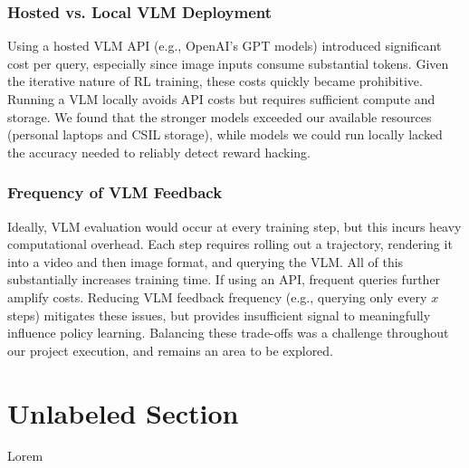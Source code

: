 \documentclass{article}
\begin{document}
\subsubsection{Hosted vs. Local VLM Deployment}
Using a hosted VLM API (e.g., OpenAI's GPT models) introduced significant cost per query, especially since image inputs consume substantial tokens. Given the iterative nature of RL training, these costs quickly became prohibitive. Running a VLM locally avoids API costs but requires sufficient compute and storage. We found that the stronger models exceeded our available resources (personal laptops and CSIL storage), while models we could run locally lacked the accuracy needed to reliably detect reward hacking.

\subsubsection{Frequency of VLM Feedback}
Ideally, VLM evaluation would occur at every training step, but this incurs heavy computational overhead. Each step requires rolling out a trajectory, rendering it into a video and then image format, and querying the VLM. All of this substantially increases training time. If using an API, frequent queries further amplify costs. Reducing VLM feedback frequency (e.g., querying only every $x$ steps) mitigates these issues, but provides insufficient signal to meaningfully influence policy learning. Balancing these trade-offs was a challenge throughout our project execution, and remains an area to be explored.


\section*{Unlabeled Section}
Lorem


 
\end{document}
